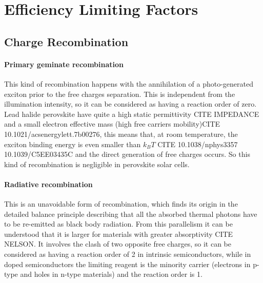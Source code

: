 \section{Efficiency Limiting Factors}

\subsection{Charge Recombination}

\paragraph{Primary geminate recombination} \label{intro_geminate} This kind of recombination happens with the annihilation of a photo-generated exciton prior to the free charges separation. This is independent from the illumination intensity, so it can be considered as having a reaction order of zero. Lead halide perovskite have quite a high static permittivity CITE IMPEDANCE and a small electron effective mass (high free carriers mobility)CITE 10.1021/acsenergylett.7b00276, this means that, at room temperature, the exciton binding energy is even smaller than $k_BT$ CITE 10.1038/nphys3357 10.1039/C5EE03435C and the direct generation of free charges occurs. So this kind of recombination is negligible in perovskite solar cells. %

\paragraph{Radiative recombination} This is an unavoidable form of recombination, which finds its origin in the detailed balance principle describing that all the absorbed thermal photons have to be re-emitted as black body radiation. From this parallelism it can be understood that it is larger for materials with greater absorptivity CITE NELSON. It involves the clash of two opposite free charges, so it can be considered as having a reaction order of 2 in intrinsic semiconductors, while in doped semiconductors the limiting reagent is the minority carrier (electrons in p-type and holes in n-type materials) and the reaction order is 1.

